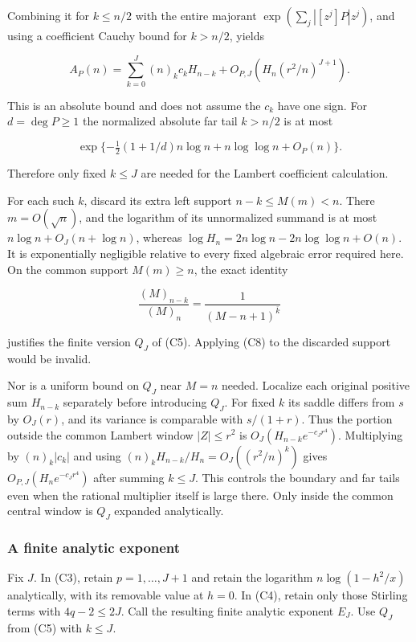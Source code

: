 Combining it for \(k\le n/2\) with the entire majorant
\(\exp(\sum_j|[z^j]P|z^j)\), and using a coefficient Cauchy bound for
\(k>n/2\), yields

\[
 A_P(n)=\sum_{k=0}^J(n)_kc_kH_{n-k}
 +O_{P,J}(H_n(r^2/n)^{J+1}).
 \tag{C7}\label{tcl:eq:C7}
\]

This is an absolute bound and does not assume the \(c_k\) have one sign.
For \(d=\deg P\ge1\) the normalized absolute far tail \(k>n/2\) is at
most

\[
 \exp\{-\tfrac12(1+1/d)n\log n+n\log\log n+O_P(n)\}.
\]

Therefore only fixed \(k\le J\) are needed for the Lambert coefficient
calculation.

For each such \(k\), discard its extra left support \(n-k\le M(m)<n\).
There \(m=O(\sqrt n)\), and the logarithm of its unnormalized summand is
at most \(n\log n+O_J(n+\log n)\), whereas
\(\log H_n=2n\log n-2n\log\log n+O(n)\). It is exponentially negligible
relative to every fixed algebraic error required here. On the common
support \(M(m)\ge n\), the exact identity

\[
 \frac{(M)_{n-k}}{(M)_n}
  =\frac1{(M-n+1)^{\overline{k}}}
 \tag{C8}\label{tcl:eq:C8}
\]

justifies the finite version \(Q_J\) of (C5). Applying (C8) to the
discarded support would be invalid.

Nor is a uniform bound on \(Q_J\) near \(M=n\) needed. Localize each
original positive sum \(H_{n-k}\) separately before introducing \(Q_J\).
For fixed \(k\) its saddle differs from \(s\) by \(O_J(r)\), and its
variance is comparable with \(s/(1+r)\). Thus the portion outside the
common Lambert window \(|Z|\le r^2\) is \(O_J(H_{n-k}e^{-c_Jr^4})\).
Multiplying by \((n)_k|c_k|\) and using
\((n)_kH_{n-k}/H_n=O_J((r^2/n)^k)\) gives \(O_{P,J}(H_ne^{-c_Jr^4})\)
after summing \(k\le J\). This controls the boundary and far tails even
when the rational multiplier itself is large there. Only inside the
common central window is \(Q_J\) expanded analytically.

\subsubsection{A finite analytic
exponent}\label{tcl:a-finite-analytic-exponent}

Fix \(J\). In (C3), retain \(p=1,\ldots,J+1\) and retain the logarithm
\(n\log(1-h^2/x)\) analytically, with its removable value at \(h=0\). In
(C4), retain only those Stirling terms with \(4q-2\le2J\). Call the
resulting finite analytic exponent \(E_J\). Use \(Q_J\) from (C5) with
\(k\le J\).

